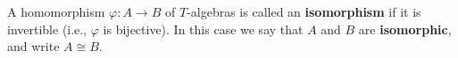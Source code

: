 A homomorphism $\varphi: A \rightarrow B$ of $T$-algebras is called an \textbf{isomorphism} if it is invertible (i.e., $\varphi$ is bijective). In this case we say that $A$ and $B$ are \textbf{isomorphic}, and write $A \cong B$.
